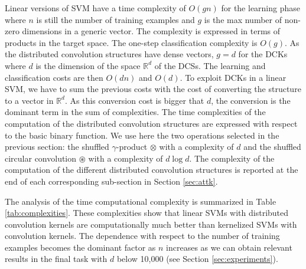 \documentclass[twoside,11pt]{article}
\def\R{\mathbb{R}}
\def\mynodes#1{N(#1)}
\def\mychar#1{C(#1)}
\def\nnodes#1{|\mynodes{#1}|}
\def\nchar#1{|\mychar{#1}|}
\def\shufprod{\otimes}
\def\shufcconv{\circledast}
\def\finalcomment#1#2{}
\def\myremove#1{}
\def\mysecondremove#1{}
\def\mysecondinsert#1{#1}
\begin{document}
Linear versions of SVM \cite{Joachims:2006:TLS:1150402.1150429,DBLP:journals/mp/Shalev-ShwartzSSC11}  have a time complexity of $O(gn)$ for the learning phase where $n$ is still the number of training examples and $g$ is the max number of non-zero dimensions in a generic vector. The complexity is expressed in terms of products in the target space. The one-step classification complexity is $O(g)$. As the distributed convolution structures  have dense vectors, $g=d$ for the DCKs where $d$ is the dimension of the space $\R^d$ of the DCSs. The learning and classification costs are then $O(dn)$ and $O(d)$. To exploit DCKs in a linear SVM, we have to sum the previous costs with the cost of converting the structure to a vector in $\R^d$. As this conversion cost is bigger that $d$, the conversion is the dominant term in the sum of complexities. 
The time complexities of the computation of the distributed convolution structures are expressed with respect to the basic \mysecondinsert{binary}\mysecondremove{composition} function. We use here the two operations selected in the previous section: the shuffled $\gamma$-product $\shufprod$ with a complexity of $d$ and the shuffled circular convolution $\shufcconv$ with a complexity of $d \log d$. The complexity of the computation of the different distributed convolution structures is reported at the end of each corresponding sub-section in Section \ref{sec:attk}.
\finalcomment{The last sentence on page 25 repeats the contents of Table 2 and is not necessary}{R1.15}
\myremove{The learning and classification complexities for the three classes of distributed convolution kernels with $\shufprod$ are:  $O(n\nnodes{t}d)$  and  $O(\nnodes{t}d)$ for DTKs, DSPKs, and DRKs; $O(np\nchar{s}d)$ and $O(p\nchar{s}d)$ for DSKs; and, $O(n\rho\nnodes{t}d)$ and $O(\rho\nnodes{t}d)$ for DSTKs. 
In the case of  $\shufcconv$, the complexities are:  $O(n\nnodes{t}d\log d)$  and  $O(\nnodes{t}d\log d)$ for DTKs, DSPKs, and DRKs; $O(np\nchar{s}d\log d)$ and $O(p\nchar{s}d\log d)$ for DSKs; and, $O(n\rho\nnodes{t}d\log d)$ and $O(\rho\nnodes{t}d\log d)$ for DSTKs.}


The \myremove{above} analysis of the time computational complexity is summarized in Table \ref{tab:complexities}. These complexities show that linear SVMs with distributed convolution kernels are computationally much better than kernelized SVMs with convolution kernels. The dependence with respect to the number of training examples becomes the dominant factor as $n$ increases as we can obtain relevant results in the final task with $d$ below 10,000 (see Section \ref{sec:experiments}).
\end{document}
